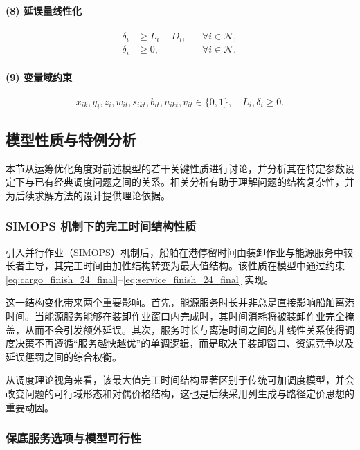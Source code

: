 \documentclass[UTF8, a4paper, 12pt]{ctexart}
\begin{document}
\paragraph{(8) 延误量线性化}
\begin{align}
\delta_i &\ge L_i - D_i,
&& \forall i \in \mathcal{N}, \\
\delta_i &\ge 0,
&& \forall i \in \mathcal{N}.
\end{align}

\paragraph{(9) 变量域约束}
\begin{equation}
x_{ik},y_i,z_i,w_{it},s_{ikt},b_{it},u_{ikt},v_{it} \in \{0,1\},
\quad
L_i,\delta_i \ge 0.
\end{equation}

\subsection{模型性质与特例分析}
\label{sec:properties}

本节从运筹优化角度对前述模型的若干关键性质进行讨论，并分析其在特定参数设定下与已有经典调度问题之间的关系。相关分析有助于理解问题的结构复杂性，并为后续求解方法的设计提供理论依据。

\subsubsection{SIMOPS 机制下的完工时间结构性质}

引入并行作业（SIMOPS）机制后，船舶在港停留时间由装卸作业与能源服务中较长者主导，其完工时间由加性结构转变为最大值结构。该性质在模型中通过约束
\eqref{eq:cargo_finish_24_final}--\eqref{eq:service_finish_24_final} 实现。

这一结构变化带来两个重要影响。首先，能源服务时长并非总是直接影响船舶离港时间。当能源服务能够在装卸作业窗口内完成时，其时间消耗将被装卸作业完全掩盖，从而不会引发额外延误。其次，服务时长与离港时间之间的非线性关系使得调度决策不再遵循“服务越快越优”的单调逻辑，而是取决于装卸窗口、资源竞争以及延误惩罚之间的综合权衡。

从调度理论视角来看，该最大值完工时间结构显著区别于传统可加调度模型，并会改变问题的可行域形态和对偶价格结构，这也是后续采用列生成与路径定价思想的重要动因。

\subsubsection{保底服务选项与模型可行性}
\end{document}
